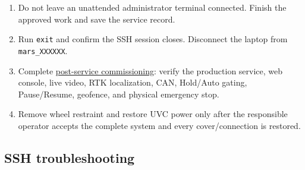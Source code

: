 \documentclass[
  10pt,
  letterpaper,
  openany]{report}
\providecommand{\tightlist}{%
  \setlength{\itemsep}{0pt}\setlength{\parskip}{0pt}}
\begin{document}
\begin{enumerate}
\tightlist
\item
  Do not leave an unattended administrator terminal connected. Finish
  the approved work and save the service record.
\item
  Run \texttt{exit} and confirm the SSH session closes. Disconnect the
  laptop from \texttt{mars\_XXXXXX}.
\item
  Complete \hyperref[nav-engineer]{post-service commissioning}: verify
  the production service, web console, live video, RTK localization,
  CAN, Hold/Auto gating, Pause/Resume, geofence, and physical emergency
  stop.
\item
  Remove wheel restraint and restore UVC power only after the
  responsible operator accepts the complete system and every
  cover/connection is restored.
\end{enumerate}

\subsection{SSH troubleshooting}\label{ssh-troubleshooting}
\end{document}
